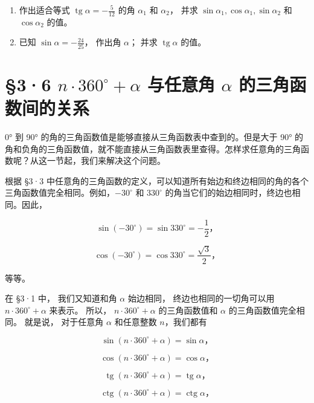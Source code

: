 \begin{enumerate}[start=3]
\item
  作出适合等式 \(\operatorname{tg} \alpha = -\frac{5}{12}\) 的角
  \(\alpha_{1}\) 和 \(\alpha_{2}\)， 并求
  \(\sin \alpha_{1}, \cos \alpha_{1}, \sin \alpha_{2}\) 和
  \(\cos \alpha_{2}\) 的值。
\item
  已知 \(\sin \alpha = -\frac{24}{25}\)， 作出角 \(\alpha\)； 并求
  \(\operatorname{tg} \alpha\) 的值。
\end{enumerate}

\section{\texorpdfstring{§3·6 \(n \cdot 360^{\circ} + \alpha\) 与任意角 \(\alpha\) 的三角函数间的关系}{§3·6 n \textbackslash cdot 360\^{}\{\textbackslash circ\} + \textbackslash alpha 与任意角 \textbackslash alpha 的三角函数间的关系}}\label{n-cdot-360circ-alpha-ux4e0eux4efbux610fux89d2-alpha-ux7684ux4e09ux89d2ux51fdux6570ux95f4ux7684ux5173ux7cfb}

0° 到 90° 的角的三角函数值是能够直接从三角函数表中查到的。但是大于 90°
的角和负角的三角函数值，就不能直接从三角函数表里查得。怎样求任意角的三角函数呢？从这一节起，我们来解决这个问题。

根据 §3·3
中任意角的三角函数的定义，可以知道所有始边和终边相同的角的各个三角函数值完全相同。例如，\(-30^{\circ}\)
和 \(330^{\circ}\) 的角当它们的始边相同时，终边也相同。因此，

\[
\sin (- 30 ^{\circ}) = \sin 330 ^{\circ} = - \frac {1}{2}\text{，}
\]

\[
\cos (- 30 ^{\circ}) = \cos 330 ^{\circ} = \frac {\sqrt {3}}{2}\text{，}
\]

等等。

在 §3·1 中， 我们又知道和角 \(\alpha\) 始边相同，
终边也相同的一切角可以用 \(n \cdot 360^{\circ} + \alpha\) 来表示。
所以， \(n \cdot 360^{\circ} + \alpha\) 的三角函数值和 \(\alpha\)
的三角函数值完全相同。 就是说， 对于任意角 \(\alpha\) 和任意整数
\(n\)，我们都有

\[
\sin (n \cdot 360 ^{\circ} + \alpha) = \sin \alpha \text{，}
\]

\[
\cos (n \cdot 360 ^{\circ} + \alpha) = \cos \alpha \text{，}
\]

\[
\operatorname{tg} (n \cdot 360 ^{\circ} + \alpha) = \operatorname{tg} \alpha \text{，}
\]

\[
\operatorname{ctg} (n \cdot 360 ^{\circ} + \alpha) = \operatorname{ctg} \alpha \text{，}
\]

